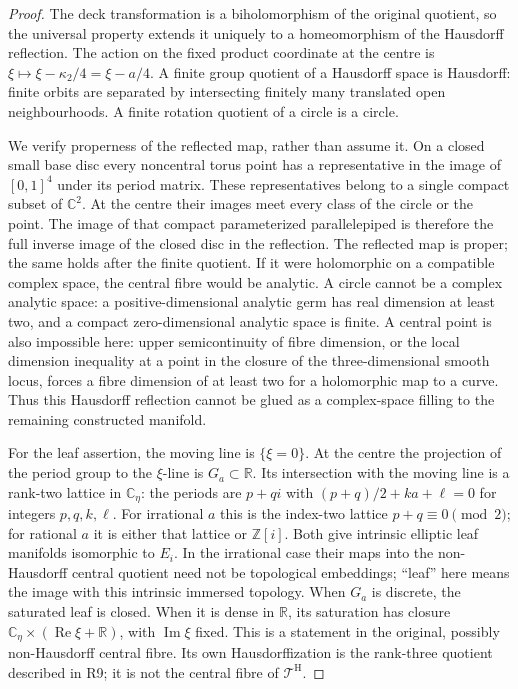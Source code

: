 \begin{proof}
The deck transformation is a biholomorphism of the original quotient,
so the universal property extends it uniquely to a homeomorphism of
the Hausdorff reflection. The action on the fixed product coordinate
at the centre is \(\xi\mapsto\xi-\kappa_2/4=\xi-a/4\).
A finite group quotient of a Hausdorff space is Hausdorff: finite
orbits are separated by intersecting finitely many translated open
neighbourhoods. A finite rotation quotient of a circle is a circle.

We verify properness of the reflected map, rather than assume it.
On a closed small base disc every noncentral torus point has a
representative in the image of \([0,1]^4\) under its period matrix.
These representatives belong to a single compact subset of
\(\mathbb C^2\). At the centre their images meet every class of the
circle or the point. The image of that compact parameterized
parallelepiped is therefore the full inverse image of the closed
disc in the reflection. The reflected map is proper; the same holds
after the finite quotient. If it were holomorphic on a compatible
complex space, the central fibre would be analytic. A circle cannot
be a complex analytic space: a positive-dimensional analytic germ
has real dimension at least two, and a compact zero-dimensional
analytic space is finite. A central point is also impossible here:
upper semicontinuity of fibre dimension, or the local dimension
inequality at a point in the closure of the three-dimensional smooth
locus, forces a fibre dimension of at least two for a holomorphic
map to a curve. Thus this Hausdorff reflection cannot be glued as a
complex-space filling to the remaining constructed manifold.

For the leaf assertion, the moving line is \(\{\xi=0\}\).
At the centre the projection of the period group to the \(\xi\)-line
is \(G_a\subset\mathbb R\). Its intersection with the moving line
is a rank-two lattice in \(\mathbb C_\eta\): the periods are
\(p+qi\) with \((p+q)/2+ka+\ell=0\) for integers
\(p,q,k,\ell\). For irrational \(a\) this is the index-two lattice
\(p+q\equiv0\pmod2\); for rational \(a\) it is either that lattice
or \(\mathbb Z[i]\). Both give intrinsic elliptic leaf manifolds isomorphic to
\(E_i\). In the irrational case their maps into the non-Hausdorff
central quotient need not be topological embeddings; ``leaf'' here
means the image with this intrinsic immersed topology. When \(G_a\)
is discrete, the saturated leaf is closed.
When it is dense in \(\mathbb R\), its saturation has closure
\(\mathbb C_\eta\times(\operatorname{Re}\xi+\mathbb R)\), with
\(\operatorname{Im}\xi\) fixed. This is a statement in the original,
possibly non-Hausdorff central fibre. Its own Hausdorffization is the
rank-three quotient described in R9; it is not the central fibre of
\(\mathcal T^{\mathrm H}\).
\end{proof}

